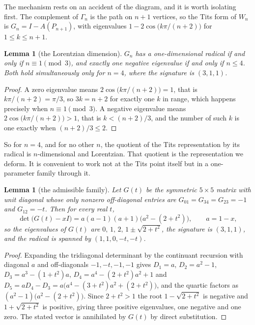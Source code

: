 \documentclass[11pt]{article}
\newtheorem{lemma}[theorem]{Lemma}
\theoremstyle{definition}
\theoremstyle{remark}
\theoremstyle{definition}
\begin{document}
The mechanism rests on an accident of the diagram, and it is worth isolating first. The complement
of $\Gamma_n$ is the path on $n+1$ vertices, so the Tits form of $W_n$ is
$G_n=I-A(P_{n+1})$, with eigenvalues $1-2\cos\bigl(k\pi/(n+2)\bigr)$ for $1\le k\le n+1$.

\begin{lemma}[the Lorentzian dimension]\label{lem:lorentz}
$G_n$ has a one-dimensional radical if and only if $n\equiv1\pmod 3$, and exactly one negative
eigenvalue if and only if $n\le4$. Both hold simultaneously only for $n=4$, where the signature is
$(3,1,1)$.
\end{lemma}

\begin{proof}
A zero eigenvalue means $2\cos\bigl(k\pi/(n+2)\bigr)=1$, that is $k\pi/(n+2)=\pi/3$, so $3k=n+2$
for exactly one $k$ in range, which happens precisely when $n\equiv1\pmod3$. A negative eigenvalue
means $2\cos\bigl(k\pi/(n+2)\bigr)>1$, that is $k<(n+2)/3$, and the number of such $k$ is one
exactly when $(n+2)/3\le2$.
\end{proof}

So for $n=4$, and for no other $n$, the quotient of the Tits representation by its radical is
$n$-dimensional and Lorentzian. That quotient is the representation we deform. It is convenient to
work not at the Tits point itself but in a one-parameter family through it.

\begin{lemma}[the admissible family]\label{lem:family}
Let $G(t)$ be the symmetric $5\times5$ matrix with unit diagonal whose only nonzero off-diagonal
entries are $G_{01}=G_{34}=G_{23}=-1$ and $G_{12}=-t$. Then for every real $t$,
\[
  \det\bigl(G(t)-xI\bigr)=a(a-1)(a+1)\bigl(a^2-(2+t^2)\bigr),\qquad a=1-x,
\]
so the eigenvalues of $G(t)$ are $0,\,1,\,2,\,1\pm\sqrt{2+t^2}$, the signature is $(3,1,1)$, and
the radical is spanned by $(1,1,0,-t,-t)$.
\end{lemma}

\begin{proof}
Expanding the tridiagonal determinant by the continuant recursion with diagonal $a$ and
off-diagonals $-1,-t,-1,-1$ gives $D_1=a$, $D_2=a^2-1$, $D_3=a^3-(1+t^2)a$,
$D_4=a^4-(2+t^2)a^2+1$ and $D_5=aD_4-D_3=a\bigl(a^4-(3+t^2)a^2+(2+t^2)\bigr)$, and the quartic
factors as $(a^2-1)\bigl(a^2-(2+t^2)\bigr)$. Since $2+t^2>1$ the root $1-\sqrt{2+t^2}$ is
negative and $1+\sqrt{2+t^2}$ is positive, giving three positive eigenvalues, one negative and one
zero. The stated vector is annihilated by $G(t)$ by direct substitution.
\end{proof}
\end{document}
